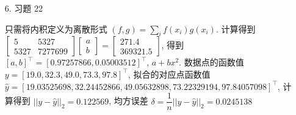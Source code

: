 \documentclass{article}
\begin{document}
\begin{spacing}{1.5}
\begin{itemize}
    \item [6.] 习题 22
    
    只需将内积定义为离散形式 $(f, g) = \sum_{i} f(x_i)g(x_i)$. 计算得到 $\left[\begin{array}{cc}5 & 5327\\5327&7277699\end{array}\right]\left[\begin{array}{c}a\\b\end{array}\right] = \left[\begin{array}{c}271.4\\369321.5\end{array}\right]$, 得到 $[a, b]^\top = [0.97257866, 0.05003512]^\top$, $a + bx^2$. 数据点的函数值 $y=[19.0 , 32.3, 49.0 , 73.3, 97.8]^\top$, 拟合的对应点函数值 $\hat{y}=[19.03525698, 32.24452866, 49.05632898, 73.22329194, 97.84057098]^\top$, 计算得到 $||y-\hat{y}||_2 = 0.122569$, 均方误差 $\delta = \dfrac{1}{n}||y-\hat{y}||_2=0.0245138$

\end{itemize}
    
\end{spacing}
\end{document}
